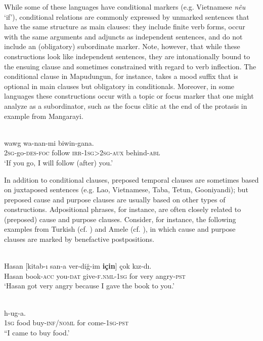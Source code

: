 \documentclass[output=paper]{langsci/langscibook}
\begin{document}
While some of these languages have conditional markers (e.g. Vietnamese \textit{nêu} ‘if’), conditional relations are commonly expressed by unmarked sentences that have the same structure as main clauses: they include finite verb forms, occur with the same arguments and adjuncts as independent sentences, and do not include an (obligatory) subordinate marker. Note, however, that while these constructions look like independent sentences, they are intonationally bound to the ensuing clause and sometimes constrained with regard to verb inflection. The conditional clause in Mapudungun, for instance, takes a mood suffix that is optional in main clauses but obligatory in conditionals. Moreover, in some languages these constructions occur with a topic or focus marker that one might analyze as a subordinator, such as the focus clitic at the end of the protasis in example  from Mangarayi.

\ea\label{ex:diessel:6}
\\
\gll   [Na-yang-gu=\textbf{bayi}]   wawg   wa-nan-mi  biwin-gana.\\
       \textsc{2sg}-go-\textsc{des-foc}    follow   \textsc{irr-1sg>2sg-aux}  behind-\textsc{abl}\\
\glt   `If you go, I will follow (after) you.'
\z

In addition to conditional clauses, preposed temporal clauses are sometimes based on juxtaposed sentences (e.g. Lao, Vietnamese, Taba, Tetun, Gooniyandi); but preposed cause and purpose clauses are usually based on other types of constructions. Adpositional phrases, for instance, are often closely related to (preposed) cause and purpose clauses. Consider, for instance, the following examples from Turkish (cf. ) and Amele (cf. ), in which cause and purpose clauses are marked by benefactive postpositions. 

\ea\label{ex:diessel:7}
\\
\gll   Hasan   [kitab-ı  san-a  ver-diğ-im  \textbf{için}]  çok  kız-dı.\\
       Hasan  book-\textsc{acc}  you-\textsc{dat}  give-\textsc{f.nml-1sg}  for  very  angry-\textsc{pst}  \\
\glt   `Hasan got very angry because I gave the book to you.'
\z

\ea\label{ex:diessel:8}
\\
  h-ug-a.\\
       \textsc{1sg}   food   buy-\textsc{inf/noml}  for  come-\textsc{1sg-pst}\\
\glt   \textsc{“}I came to buy food.'
\z
\end{document}
